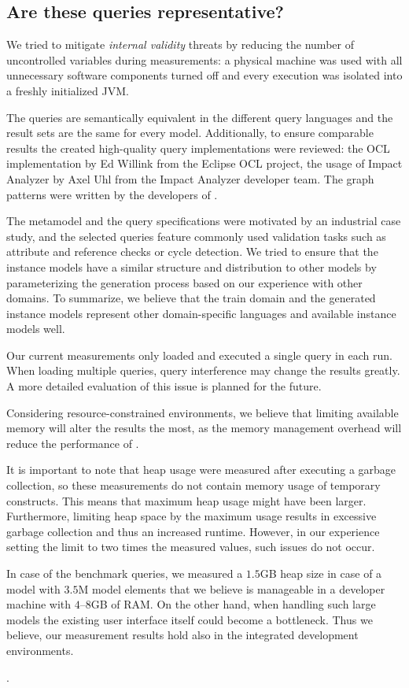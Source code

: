 \subsection{Are these queries representative?}


We tried to mitigate \emph{internal validity} threats by reducing the number of
uncontrolled variables during measurements: a physical machine was used with all
unnecessary software components turned off and every execution was isolated into
a freshly initialized JVM.

The queries are semantically equivalent in the different query languages and the
result sets are the same for every model. Additionally, to ensure comparable
results the created high-quality query implementations were reviewed: the OCL
implementation by Ed Willink from the Eclipse OCL project, the usage of Impact
Analyzer by Axel Uhl from the Impact Analyzer developer team. The graph patterns
were written by the developers of \incquery{}.

The metamodel and the query specifications were motivated by an industrial case
study, and the selected queries feature commonly used validation tasks such as
attribute and reference checks or cycle detection. We tried to ensure that the
instance models have a similar structure and distribution to other models by
parameterizing the generation process based on our experience with other
domains. To summarize, we believe that the train domain and the generated
instance models represent other domain-specific languages and available instance
models well.

Our current measurements only loaded and executed a single query in each run.
When loading multiple queries, query interference may change the results
greatly. A more detailed evaluation of this issue is planned for the future.

Considering resource-constrained environments, we believe that limiting
available memory will alter the results the most, as the memory management
overhead will reduce the performance of \incquery{}.

It is important to note that heap usage were measured after executing a garbage
collection, so these measurements do not contain memory usage of temporary
constructs. This means that maximum heap usage might have been larger. Furthermore,
limiting heap space by the maximum usage results in excessive garbage collection
and thus an increased runtime. However, in our experience setting the limit to
two times the measured values, such issues do not occur.

In case of the benchmark queries, we measured a $1.5$GB heap size in case of a
model with $3.5$M model elements that we believe is manageable in a developer
machine with $4$--$8$GB of RAM. On the other hand, when handling such large
models the existing user interface itself could become a bottleneck. Thus we
believe, our measurement results hold also in the integrated development
environments.

.